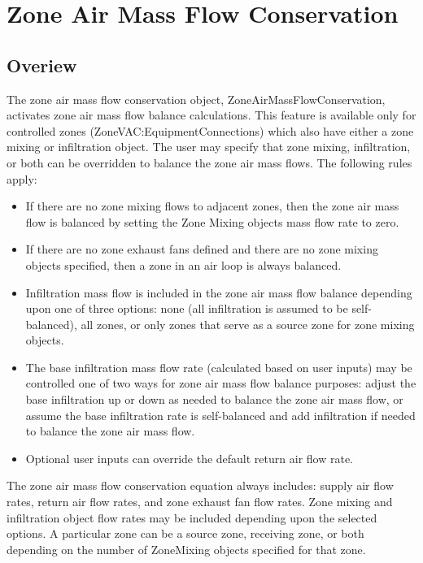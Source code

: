 \section{Zone Air Mass Flow Conservation}\label{zone-air-mass-flow-conservation}

\subsection{Overiew}\label{overiew}

The zone air mass flow conservation object, ZoneAirMassFlowConservation, activates zone air mass flow balance calculations. This feature is available only for controlled zones (ZoneVAC:EquipmentConnections) which also have either a zone mixing or infiltration object. The user may specify that zone mixing, infiltration, or both can be overridden to balance the zone air mass flows. The following rules apply:

\begin{itemize}
\tightlist
\item
  If there are no zone mixing flows to adjacent zones, then the zone air mass flow is balanced by setting the Zone Mixing objects mass flow rate to zero.
\item
  If there are no zone exhaust fans defined and there are no zone mixing objects specified, then a zone in an air loop is always balanced.
\item
  Infiltration mass flow is included in the zone air mass flow balance depending upon one of three options: none (all infiltration is assumed to be self-balanced), all zones, or only zones that serve as a source zone for zone mixing objects.
\item
  The base infiltration mass flow rate (calculated based on user inputs) may be controlled one of two ways for zone air mass flow balance purposes: adjust the base infiltration up or down as needed to balance the zone air mass flow, or assume the base infiltration rate is self-balanced and add infiltration if needed to balance the zone air mass flow.
\item
  Optional user inputs can override the default return air flow rate.
\end{itemize}

The zone air mass flow conservation equation always includes: supply air flow rates, return air flow rates, and zone exhaust fan flow rates. Zone mixing and infiltration object flow rates may be included depending upon the selected options. A particular zone can be a source zone, receiving zone, or both depending on the number of ZoneMixing objects specified for that zone.


